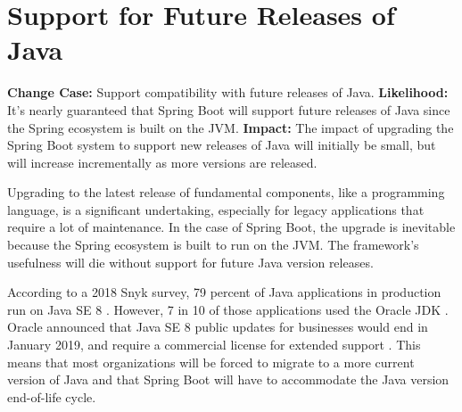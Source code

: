 \section*{Support for Future Releases of Java}

\begin{textbox}
	\obeylines
	\textbf{Change Case:} Support compatibility with future releases of Java.
	\textbf{Likelihood:} It's nearly guaranteed that Spring Boot will support future releases of Java since the Spring ecosystem is built on the JVM.
	\textbf{Impact:} The impact of upgrading the Spring Boot system to support new releases of Java will initially be small, but will increase incrementally as more versions are released.
\end{textbox}

\medskip

Upgrading to the latest release of fundamental components, like a programming language, is a significant undertaking, especially for legacy applications that require a lot of maintenance. In the case of Spring Boot, the upgrade is inevitable because the Spring ecosystem is built to run on the JVM. The framework's usefulness will die without support for future Java version releases.

According to a 2018 Snyk survey, 79 percent of Java applications in production run on Java SE 8 \cite{snyk:online}. However, 7 in 10 of those applications used the Oracle JDK \cite{snyk:online}. Oracle announced that Java SE 8 public updates for businesses would end in January 2019, and require a commercial license for extended support \cite{oraclejava:online}. This means that most organizations will be forced to migrate to a more current version of Java and that Spring Boot will have to accommodate the Java version end-of-life cycle.